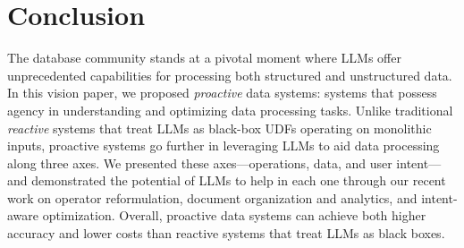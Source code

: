 
\section{Conclusion}

The database community stands at a pivotal moment where LLMs offer unprecedented capabilities for processing both structured and unstructured data. In this vision paper, we proposed {\em proactive} data systems: systems that possess agency in understanding and optimizing data processing tasks. Unlike traditional {\em reactive} systems that treat LLMs as black-box UDFs operating on monolithic inputs, proactive systems go further in leveraging LLMs to aid data processing along three axes. We presented these axes---operations, data, and user intent---and demonstrated the potential of LLMs to help in each one through our recent work on operator reformulation, document organization and analytics, and intent-aware optimization. Overall, proactive data systems can achieve both higher accuracy and lower costs than reactive systems that treat LLMs as black boxes.


